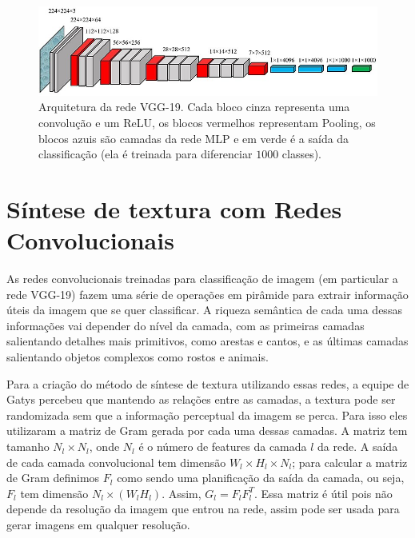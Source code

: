 \begin{figure}[!ht]
	\centering
	\includegraphics[width=\linewidth*5/6]{files/assets/deeplearning/vgg19.png}
	\caption{Arquitetura da rede VGG-19. Cada bloco cinza representa
	uma convolução e um ReLU, os blocos vermelhos representam 
	Pooling, os blocos azuis são camadas da rede MLP e em verde é a
	saída da classificação (ela é treinada para diferenciar $1000$
	classes).}
	\label{img:preview}
\end{figure}





\section{Síntese de textura com Redes Convolucionais}

As redes convolucionais
treinadas para classificação de imagem (em particular
a rede VGG-19) fazem uma série de operações em
pirâmide para extrair informação úteis da imagem que
se quer classificar. A riqueza semântica de cada
uma dessas informações vai depender do nível da camada,
com as primeiras camadas salientando detalhes
mais primitivos, como arestas e cantos, e as últimas
camadas salientando objetos complexos como rostos
e animais.


Para a criação do método de síntese de textura
utilizando essas redes, a equipe de Gatys percebeu que 
mantendo as relações entre as camadas,
a textura pode ser randomizada sem que 
a informação perceptual da imagem se perca.
Para isso eles utilizaram a matriz de Gram gerada por cada
uma dessas camadas. A matriz tem tamanho $N_l \times N_l$,
onde $N_l$ é o número de features da camada $l$ da rede.
A saída de cada camada convolucional tem dimensão
$W_l\times H_l \times N_l$; para calcular a matriz de Gram
definimos $F_l$ como sendo uma planificação da 
saída da camada, ou seja, $F_l$ tem dimensão $N_l \times (W_l H_l)$.
Assim, $G_l = F_lF_l^T$. Essa matriz é útil pois não 
depende da resolução da imagem que entrou na rede,
assim pode ser usada para gerar imagens em
qualquer resolução.

